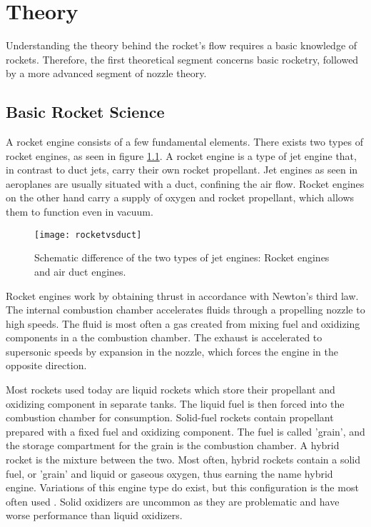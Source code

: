 \chapter{Theory}

	Understanding the theory behind the rocket's flow requires a basic knowledge of rockets. Therefore, the first theoretical segment concerns basic rocketry, followed by a more advanced segment of nozzle theory.

\section{Basic Rocket Science}

	A rocket engine consists of a few fundamental elements. There exists two types of rocket engines, as seen in figure \ref{fig:rocketvsduct}. A rocket engine is a type of jet engine that, in contrast to duct jets, carry their own rocket propellant. Jet engines as seen in aeroplanes are usually situated with a duct, confining the air flow. Rocket engines on the other hand carry a supply of oxygen and rocket propellant, which allows them to function even in vacuum.

	\begin{figure}
		\centering
		\texttt{[image: rocketvsduct]}
		\caption{Schematic difference of the two types of jet engines: Rocket engines and air duct engines.}
		\label{fig:rocketvsduct}
	\end{figure}

	Rocket engines work by obtaining thrust in accordance with Newton's third law. The internal combustion chamber accelerates fluids through a propelling nozzle to high speeds. The fluid is most often a gas created from mixing fuel and oxidizing components in a the combustion chamber. The exhaust is accelerated to supersonic speeds by expansion in the nozzle, which forces the engine in the opposite direction.

	Most rockets used today are liquid rockets which store their propellant and oxidizing component in separate tanks. The liquid fuel is then forced into the combustion chamber for consumption. Solid-fuel rockets contain propellant prepared with a fixed fuel and oxidizing component. The fuel is called 'grain', and the storage compartment for the grain is the combustion chamber. A hybrid rocket is the mixture between the two. Most often, hybrid rockets contain a solid fuel, or 'grain' and liquid or gaseous oxygen, thus earning the name hybrid engine. Variations of this engine type do exist, but this configuration is the most often used \cite{rockProp}. Solid oxidizers are uncommon as they are problematic and have worse performance than liquid oxidizers.

